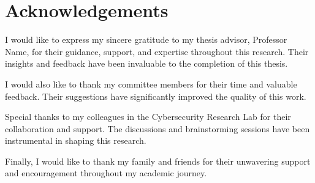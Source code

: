 \chapter*{Acknowledgements}


I would like to express my sincere gratitude to my thesis advisor, Professor Name, for their guidance, support, and expertise throughout this research. Their insights and feedback have been invaluable to the completion of this thesis.

I would also like to thank my committee members for their time and valuable feedback. Their suggestions have significantly improved the quality of this work.

Special thanks to my colleagues in the Cybersecurity Research Lab for their collaboration and support. The discussions and brainstorming sessions have been instrumental in shaping this research.

Finally, I would like to thank my family and friends for their unwavering support and encouragement throughout my academic journey. 

